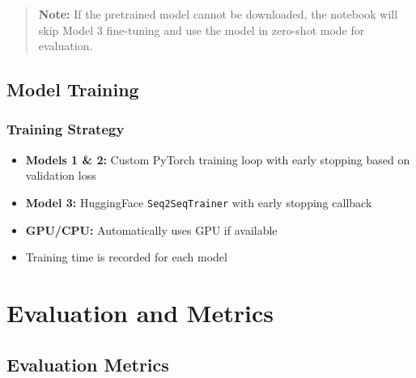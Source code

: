 \documentclass[12pt,a4paper,oneside]{report}
\providecommand{\tightlist}{\setlength{\itemsep}{0pt}\setlength{\parskip}{0pt}}
\begin{document}
\begin{quote}
\textbf{Note:} If the pretrained model cannot be downloaded, the notebook will skip Model 3 fine-tuning and use the model in zero-shot mode for evaluation.
\end{quote}

\hypertarget{model-training}{%
\subsection{Model Training}\label{model-training}}

\hypertarget{training-strategy}{%
\subsubsection{Training Strategy}\label{training-strategy}}

\begin{itemize}
\tightlist
\item
  \textbf{Models 1 \& 2:} Custom PyTorch training loop with early stopping based on validation loss
\item
  \textbf{Model 3:} HuggingFace \texttt{Seq2SeqTrainer} with early stopping callback
\item
  \textbf{GPU/CPU:} Automatically uses GPU if available
\item
  Training time is recorded for each model
\end{itemize}

\section{Evaluation and Metrics}
\hypertarget{evaluation-metrics}{%
\subsection{Evaluation Metrics}\label{evaluation-metrics}}
\end{document}
